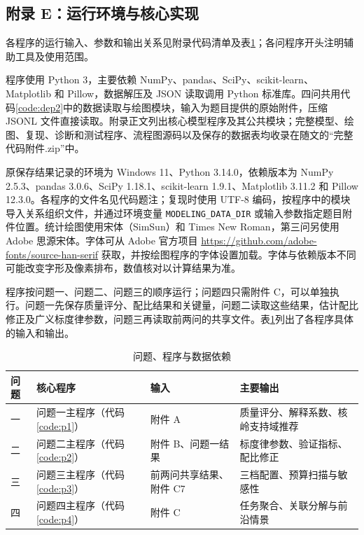 \subsection*{附录 E：运行环境与核心实现}

各程序的运行输入、参数和输出关系见附录代码清单及表\ref{tab:code_map}；各问程序开头注明辅助工具及使用范围。

程序使用 Python 3，主要依赖 NumPy、pandas、SciPy、scikit-learn、Matplotlib 和 Pillow，数据解压及 JSON 读取调用 Python 标准库。四问共用代码\ref{code:dep2}中的数据读取与绘图模块，输入为题目提供的原始附件，压缩 JSONL 文件直接读取。附录正文列出核心模型程序及其公共模块；完整模型、绘图、复现、诊断和测试程序、流程图源码以及保存的数据表均收录在随文的“完整代码附件.zip”中。

原保存结果记录的环境为 Windows 11、Python 3.14.0，依赖版本为 NumPy 2.5.3、pandas 3.0.6、SciPy 1.18.1、scikit-learn 1.9.1、Matplotlib 3.11.2 和 Pillow 12.3.0。各程序的文件名见代码题注；复现时使用 UTF-8 编码，按程序中的模块导入关系组织文件，并通过环境变量 \texttt{MODELING\_DATA\_DIR} 或输入参数指定题目附件位置。统计绘图使用宋体（SimSun）和 Times New Roman，第三问另使用 Adobe 思源宋体。字体可从 Adobe 官方项目 \url{https://github.com/adobe-fonts/source-han-serif} 获取，并按绘图程序的字体设置加载。字体与依赖版本不同可能改变字形及像素排布，数值核对以计算结果为准。

程序按问题一、问题二、问题三的顺序运行；问题四只需附件 C，可以单独执行。问题一先保存质量评分、配比结果和关键量，问题二读取这些结果，估计配比修正及广义标度律参数，问题三再读取前两问的共享文件。表\ref{tab:code_map}列出了各程序具体的输入和输出。

\begin{table}[!htbp]
\centering
\caption{问题、程序与数据依赖}\label{tab:code_map}
\begin{tabularx}{\textwidth}{@{}p{}>{\raggedright\arraybackslash}p{}XX@{}}
\toprule
问题 & 核心程序 & 输入 & 主要输出\\
\midrule
一 & 问题一主程序（代码\ref{code:p1}） & 附件 A & 质量评分、解释系数、核岭支持域推荐\\
二 & 问题二主程序（代码\ref{code:p2}） & 附件 B、问题一结果 & 标度律参数、验证指标、配比修正\\
三 & 问题三主程序（代码\ref{code:p3}） & 前两问共享结果、附件 C7 & 三档配置、预算扫描与敏感性\\
四 & 问题四主程序（代码\ref{code:p4}） & 附件 C & 任务聚合、关联分解与前沿情景\\
\bottomrule
\end{tabularx}
\end{table}

